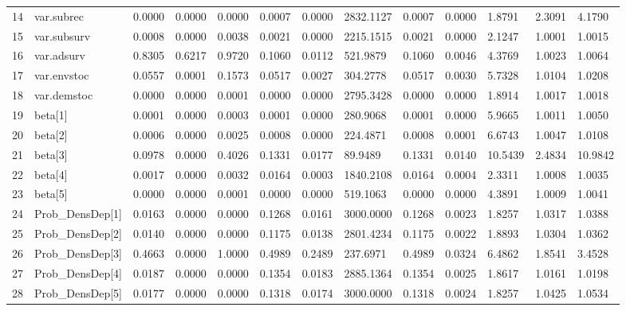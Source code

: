 \begin{table}[ht]
\begin{tabular}{rllllllllllll}
  14 & var.subrec &   0.0000 &    0.0000 &   0.0000 &   0.0007 &     0.0000 & 2832.1127 &   0.0007 &  0.0000 &  1.8791 & 2.3091 &  4.1790 \\ 
  15 & var.subsurv &   0.0008 &    0.0000 &   0.0038 &   0.0021 &     0.0000 & 2215.1515 &   0.0021 &  0.0000 &  2.1247 & 1.0001 &  1.0015 \\ 
  16 & var.adsurv &   0.8305 &    0.6217 &   0.9720 &   0.1060 &     0.0112 &  521.9879 &   0.1060 &  0.0046 &  4.3769 & 1.0023 &  1.0064 \\ 
  17 & var.envstoc &   0.0557 &    0.0001 &   0.1573 &   0.0517 &     0.0027 &  304.2778 &   0.0517 &  0.0030 &  5.7328 & 1.0104 &  1.0208 \\ 
  18 & var.demstoc &   0.0000 &    0.0000 &   0.0001 &   0.0000 &     0.0000 & 2795.3428 &   0.0000 &  0.0000 &  1.8914 & 1.0017 &  1.0018 \\ 
  19 & beta[1] &   0.0001 &    0.0000 &   0.0003 &   0.0001 &     0.0000 &  280.9068 &   0.0001 &  0.0000 &  5.9665 & 1.0011 &  1.0050 \\ 
  20 & beta[2] &   0.0006 &    0.0000 &   0.0025 &   0.0008 &     0.0000 &  224.4871 &   0.0008 &  0.0001 &  6.6743 & 1.0047 &  1.0108 \\ 
  21 & beta[3] &   0.0978 &    0.0000 &   0.4026 &   0.1331 &     0.0177 &   89.9489 &   0.1331 &  0.0140 & 10.5439 & 2.4834 & 10.9842 \\ 
  22 & beta[4] &   0.0017 &    0.0000 &   0.0032 &   0.0164 &     0.0003 & 1840.2108 &   0.0164 &  0.0004 &  2.3311 & 1.0008 &  1.0035 \\ 
  23 & beta[5] &   0.0000 &    0.0000 &   0.0001 &   0.0000 &     0.0000 &  519.1063 &   0.0000 &  0.0000 &  4.3891 & 1.0009 &  1.0041 \\ 
  24 & Prob\_DensDep[1] &   0.0163 &    0.0000 &   0.0000 &   0.1268 &     0.0161 & 3000.0000 &   0.1268 &  0.0023 &  1.8257 & 1.0317 &  1.0388 \\ 
  25 & Prob\_DensDep[2] &   0.0140 &    0.0000 &   0.0000 &   0.1175 &     0.0138 & 2801.4234 &   0.1175 &  0.0022 &  1.8893 & 1.0304 &  1.0362 \\ 
  26 & Prob\_DensDep[3] &   0.4663 &    0.0000 &   1.0000 &   0.4989 &     0.2489 &  237.6971 &   0.4989 &  0.0324 &  6.4862 & 1.8541 &  3.4528 \\ 
  27 & Prob\_DensDep[4] &   0.0187 &    0.0000 &   0.0000 &   0.1354 &     0.0183 & 2885.1364 &   0.1354 &  0.0025 &  1.8617 & 1.0161 &  1.0198 \\ 
  28 & Prob\_DensDep[5] &   0.0177 &    0.0000 &   0.0000 &   0.1318 &     0.0174 & 3000.0000 &   0.1318 &  0.0024 &  1.8257 & 1.0425 &  1.0534 \\ 

\end{tabular}
\end{table}
